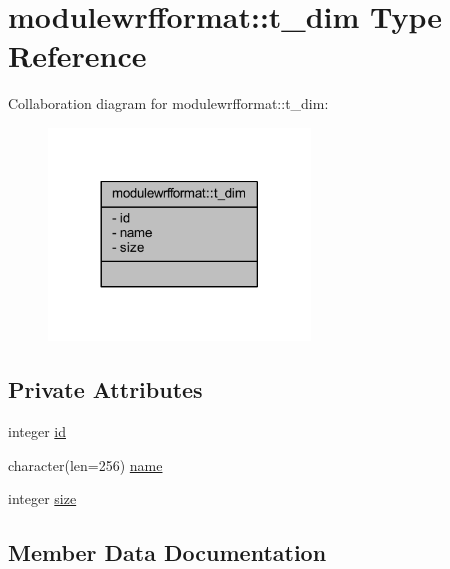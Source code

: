 \hypertarget{structmodulewrfformat_1_1t__dim}{}\section{modulewrfformat\+:\+:t\+\_\+dim Type Reference}
\label{structmodulewrfformat_1_1t__dim}


Collaboration diagram for modulewrfformat\+:\+:t\+\_\+dim\+:\nopagebreak
\begin{figure}[H]
\begin{center}
\leavevmode
\includegraphics[width=197pt]{structmodulewrfformat_1_1t__dim__coll__graph}
\end{center}
\end{figure}
\subsection*{Private Attributes}
\begin{DoxyCompactItemize}
\item 
integer \mbox{\hyperlink{structmodulewrfformat_1_1t__dim_ada0f5fe3e3cf3c26b627c7e208003215}{id}}
\item 
character(len=256) \mbox{\hyperlink{structmodulewrfformat_1_1t__dim_a1e8f26413e32db9f7a4fd7adca2f3b23}{name}}
\item 
integer \mbox{\hyperlink{structmodulewrfformat_1_1t__dim_a6fdba378b3af73656b6d109880ff56c1}{size}}
\end{DoxyCompactItemize}


\subsection{Member Data Documentation}
\mbox{\label{structmodulewrfformat_1_1t__dim_ada0f5fe3e3cf3c26b627c7e208003215}} 
